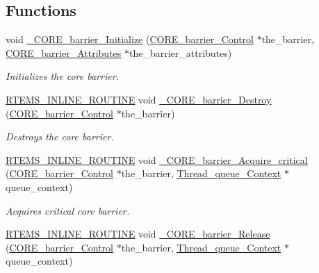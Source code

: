 \subsection*{Functions}
\begin{DoxyCompactItemize}
\item 
void \mbox{\hyperlink{group__RTEMSScoreBarrier_gaac782837cb16f03f77181789e809fb1b}{\+\_\+\+C\+O\+R\+E\+\_\+barrier\+\_\+\+Initialize}} (\mbox{\hyperlink{structCORE__barrier__Control}{C\+O\+R\+E\+\_\+barrier\+\_\+\+Control}} $\ast$the\+\_\+barrier, \mbox{\hyperlink{structCORE__barrier__Attributes}{C\+O\+R\+E\+\_\+barrier\+\_\+\+Attributes}} $\ast$the\+\_\+barrier\+\_\+attributes)
\begin{DoxyCompactList}\small\item\em Initializes the core barrier. \end{DoxyCompactList}\item 
\mbox{\hyperlink{group__RTEMSScoreBaseDefs_gac216239df231d5dbd15e3520b0b9313f}{R\+T\+E\+M\+S\+\_\+\+I\+N\+L\+I\+N\+E\+\_\+\+R\+O\+U\+T\+I\+NE}} void \mbox{\hyperlink{group__RTEMSScoreBarrier_gac37a2a9dcff37c4735c8be35ba0fbefe}{\+\_\+\+C\+O\+R\+E\+\_\+barrier\+\_\+\+Destroy}} (\mbox{\hyperlink{structCORE__barrier__Control}{C\+O\+R\+E\+\_\+barrier\+\_\+\+Control}} $\ast$the\+\_\+barrier)
\begin{DoxyCompactList}\small\item\em Destroys the core barrier. \end{DoxyCompactList}\item 
\mbox{\hyperlink{group__RTEMSScoreBaseDefs_gac216239df231d5dbd15e3520b0b9313f}{R\+T\+E\+M\+S\+\_\+\+I\+N\+L\+I\+N\+E\+\_\+\+R\+O\+U\+T\+I\+NE}} void \mbox{\hyperlink{group__RTEMSScoreBarrier_ga8e1bfa64db88514abb54847074010ee8}{\+\_\+\+C\+O\+R\+E\+\_\+barrier\+\_\+\+Acquire\+\_\+critical}} (\mbox{\hyperlink{structCORE__barrier__Control}{C\+O\+R\+E\+\_\+barrier\+\_\+\+Control}} $\ast$the\+\_\+barrier, \mbox{\hyperlink{structThread__queue__Context}{Thread\+\_\+queue\+\_\+\+Context}} $\ast$queue\+\_\+context)
\begin{DoxyCompactList}\small\item\em Acquires critical core barrier. \end{DoxyCompactList}\item 
\mbox{\hyperlink{group__RTEMSScoreBaseDefs_gac216239df231d5dbd15e3520b0b9313f}{R\+T\+E\+M\+S\+\_\+\+I\+N\+L\+I\+N\+E\+\_\+\+R\+O\+U\+T\+I\+NE}} void \mbox{\hyperlink{group__RTEMSScoreBarrier_ga7de90fb9af1cf1c3e625fcab7d25e4af}{\+\_\+\+C\+O\+R\+E\+\_\+barrier\+\_\+\+Release}} (\mbox{\hyperlink{structCORE__barrier__Control}{C\+O\+R\+E\+\_\+barrier\+\_\+\+Control}} $\ast$the\+\_\+barrier, \mbox{\hyperlink{structThread__queue__Context}{Thread\+\_\+queue\+\_\+\+Context}} $\ast$queue\+\_\+context)

\end{DoxyCompactItemize}

